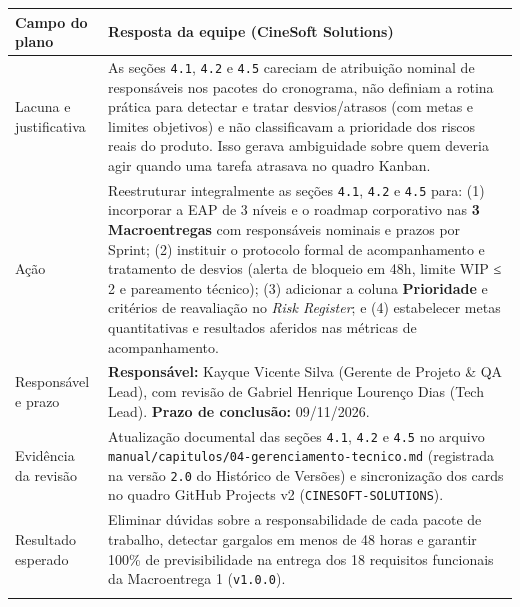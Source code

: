 {\footnotesize
\begin{tabularx}{\textwidth}{>{\fontSemiBold\color{BrandNavy}\hsize=0.451\hsize\sloppy\arraybackslash}X >{\hsize=1.549\hsize\sloppy\arraybackslash}X}
\arrayrulecolor{GithubTableBorder}\toprule
\rowcolor{BrandTableHeader}
\textbf{Campo do plano} & \textbf{Resposta da equipe (CineSoft Solutions)} \\
\midrule
\arrayrulecolor{BrandGrayRule}
Lacuna e justificativa & As seções \texttt{4.1}, \texttt{4.2} e \texttt{4.5} careciam de atribuição nominal de responsáveis nos pacotes do cronograma, não definiam a rotina prática para detectar e tratar desvios/atrasos (com metas e limites objetivos) e não classificavam a prioridade dos riscos reais do produto. Isso gerava ambiguidade sobre quem deveria agir quando uma tarefa atrasava no quadro Kanban. \\
\midrule
Ação & Reestruturar integralmente as seções \texttt{4.1}, \texttt{4.2} e \texttt{4.5} para: (1) incorporar a EAP de 3 níveis e o roadmap corporativo nas \textbf{3 Macroentregas} com responsáveis nominais e prazos por Sprint; (2) instituir o protocolo formal de acompanhamento e tratamento de desvios (alerta de bloqueio em 48h, limite WIP ≤ 2 e pareamento técnico); (3) adicionar a coluna \textbf{Prioridade} e critérios de reavaliação no \emph{Risk Register}; e (4) estabelecer metas quantitativas e resultados aferidos nas métricas de acompanhamento. \\
\midrule
Responsável e prazo & \textbf{Responsável:} Kayque Vicente Silva (Gerente de Projeto \& QA Lead), com revisão de Gabriel Henrique Lourenço Dias (Tech Lead). \textbf{Prazo de conclusão:} 09/11/2026. \\
\midrule
Evidência da revisão & Atualização documental das seções \texttt{4.1}, \texttt{4.2} e \texttt{4.5} no arquivo \texttt{manual/\allowbreak{}capitulos/\allowbreak{}04-\allowbreak{}gerenciamento-\allowbreak{}tecnico.\allowbreak{}md} (registrada na versão \texttt{2.0} do Histórico de Versões) e sincronização dos cards no quadro GitHub Projects v2 (\texttt{CINESOFT-\allowbreak{}SOLUTIONS}). \\
\midrule
Resultado esperado & Eliminar dúvidas sobre a responsabilidade de cada pacote de trabalho, detectar gargalos em menos de 48 horas e garantir 100\% de previsibilidade na entrega dos 18 requisitos funcionais da Macroentrega 1 (\texttt{v1.0.0}). \\
\arrayrulecolor{GithubTableBorder}\bottomrule
\end{tabularx}%
}
